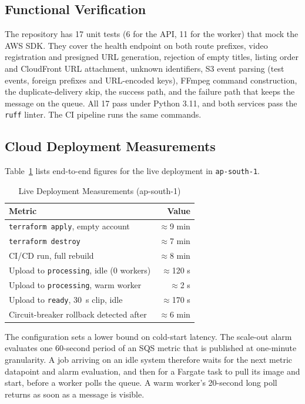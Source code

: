 \documentclass[conference]{IEEEtran}
\begin{document}
\subsection{Functional Verification}
The repository has 17 unit tests (6 for the API, 11 for the worker) that mock the AWS SDK. They cover the health endpoint on both route prefixes, video registration and presigned URL generation, rejection of empty titles, listing order and CloudFront URL attachment, unknown identifiers, S3 event parsing (test events, foreign prefixes and URL-encoded keys), FFmpeg command construction, the duplicate-delivery skip, the success path, and the failure path that keeps the message on the queue. All 17 pass under Python 3.11, and both services pass the \texttt{ruff} linter. The CI pipeline runs the same commands.

\subsection{Cloud Deployment Measurements}
Table~\ref{tab:cloud} lists end-to-end figures for the live deployment in \texttt{ap-south-1}.

\begin{table}[t]
\caption{Live Deployment Measurements (ap-south-1)}
\label{tab:cloud}
\centering
\begin{tabular}{@{}lr@{}}
\toprule
Metric & Value \\
\midrule
\texttt{terraform apply}, empty account & $\approx$9 min \\
\texttt{terraform destroy} & $\approx$7 min \\
CI/CD run, full rebuild & $\approx$8 min \\
Upload to \texttt{processing}, idle (0 workers) & $\approx$120 s \\
Upload to \texttt{processing}, warm worker & $\approx$2 s \\
Upload to \texttt{ready}, 30~s clip, idle & $\approx$170 s \\
Circuit-breaker rollback detected after & $\approx$6 min \\
\bottomrule
\end{tabular}
\end{table}

The configuration sets a lower bound on cold-start latency. The scale-out alarm evaluates one 60-second period of an SQS metric that is published at one-minute granularity. A job arriving on an idle system therefore waits for the next metric datapoint and alarm evaluation, and then for a Fargate task to pull its image and start, before a worker polls the queue. A warm worker's 20-second long poll returns as soon as a message is visible.
\end{document}
